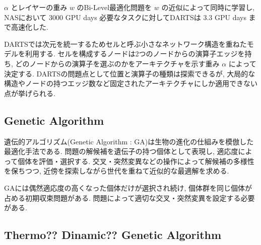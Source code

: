 $\alpha$ とレイヤーの重み $w$ のBi-Level最適化問題を $w$ の近似によって同時に学習し,
NASにおいて 3000 GPU days 必要なタスクに対してDARTSは 3.3 GPU days まで高速化した.

DARTSでは次元を統一するためセルと呼ぶ小さなネットワーク構造を重ねたモデルを利用する.
セルを構成するノードは2つのノードからの演算子エッジを持ち,
どのノードからの演算子を選ぶのかをアーキテクチャを示す重み $\alpha$ によって決定する.
DARTSの問題点として位置と演算子の種類は探索できるが,
大局的な構造やノードの持つエッジ数など固定されたアーキテクチャにしか適用できない点が挙げられる.


\changeindent{0cm}
\subsection{Genetic Algorithm}
\changeindent{2cm}
\label{sec:02_ga}
遺伝的アルゴリズム(Genetic Algorithm : GA)は生物の進化の仕組みを模倣した最適化手法である.
問題の解候補を遺伝子の持つ個体として表現し, 適応度によって個体を評価・選択する.
交叉・突然変異などの操作によって解候補の多様性を保ちつつ,
近傍を探索しながら世代を重ねて近似的な最適解を求める.


GAには偶然適応度の高くなった個体だけが選択され続け,
個体群を同じ個体が占める初期収束問題がある.
問題によって適切な交叉・突然変異を設定する必要がある.


\changeindent{0cm}
\subsection{Thermo?? Dinamic?? Genetic Algorithm}
\changeindent{2cm}
\label{sec:02_tdga}


%
